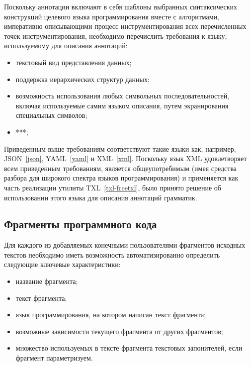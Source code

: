 Поскольку аннотации включают в себя
шаблоны выбранных синтаксических конструкций целевого языка программирования вместе с 
алгоритмами, императивно описывающими процесс инструментирования всех перечисленных точек инструментирования,
необходимо перечислить требования к языку, используемому для описания аннотаций:

\begin{itemize}[noitemsep]
  \item текстовый вид представления данных;
  \item поддержка иерархических структур данных;
  \item возможность использования любых символьных последовательностей, включая используемые самим языком описания, путем экранирования специальных символов;
  \item ***;
\end{itemize}

Приведенным выше требованиям соответствуют такие языки как, например, JSON~\ref{json}, YAML~\ref{yaml} и XML~\ref{xml}.
Поскольку язык XML удовлетворяет всем приведенным требованиям, является общеупотребимым (имея средства разбора для широкого спектра языков программирования) и применяется как часть реализации утилиты TXL~\ref{txl-freetxl}, было принято решение об использовании этого языка для описания аннотаций грамматик.

\subsection{Фрагменты программного кода}

Для каждого из добавляемых конечными пользователями фрагментов исходных текстов необходимо иметь возможность автоматизированно определить следующие ключевые характеристики:

\begin{itemize}[noitemsep]
  \item название фрагмента;
  \item текст фрагмента;
  \item язык программирования, на котором написан текст фрагмента;
  \item возможные зависимости текущего фрагмента от других фрагментов;
  \item множество используемых в тексте фрагмента текстовых запонителей, если фрагмент параметризуем.
\end{itemize}

